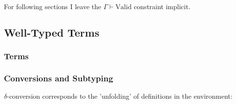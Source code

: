 \documentclass{article}
\newcommand{\set}{\mathcal{U}}
\newcommand{\fun}[2]{\lambda #1. #2}
\newcommand{\for}[2]{\Pi_{#1}#2}
\newcommand{\evals}{\rightsquigarrow^{nf}}
\begin{document}
For following sections I leave the $\Gamma \vdash \mathrm{Valid}$ constraint implicit.

\subsection{Well-Typed Terms}

\subsubsection{Terms}


\subsubsection{Conversions and Subtyping}

$\delta$-conversion corresponds to the 'unfolding' of definitions in the environment:
\end{document}
